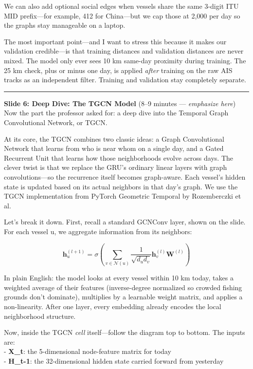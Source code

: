 \documentclass[
]{article}
\begin{document}
We can also add optional social edges when vessels share the same
3-digit ITU MID prefix---for example, 412 for China---but we cap those
at 2,000 per day so the graphs stay manageable on a laptop.

The most important point---and I want to stress this because it makes
our validation credible---is that training distances and validation
distances are never mixed. The model only ever sees 10 km same-day
proximity during training. The 25 km check, plus or minus one day, is
applied \emph{after} training on the raw AIS tracks as an independent
filter. Training and validation stay completely separate.

\begin{center}\rule{0.5\linewidth}{0.5pt}\end{center}

\textbf{Slide 6: Deep Dive: The TGCN Model} (8--9 minutes ---
\emph{emphasize here})\\
Now the part the professor asked for: a deep dive into the Temporal
Graph Convolutional Network, or TGCN.

At its core, the TGCN combines two classic ideas: a Graph Convolutional
Network that learns from who is near whom on a single day, and a Gated
Recurrent Unit that learns how those neighborhoods evolve across days.
The clever twist is that we replace the GRU's ordinary linear layers
with graph convolutions---so the recurrence itself becomes graph-aware.
Each vessel's hidden state is updated based on its actual neighbors in
that day's graph. We use the TGCN implementation from PyTorch Geometric
Temporal by Rozemberczki et al.

Let's break it down. First, recall a standard GCNConv layer, shown on
the slide. For each vessel u, we aggregate information from its
neighbors:

\[
\mathbf{h}_u^{(l+1)} = \sigma\left( \sum_{v \in \mathcal{N}(u)} \frac{1}{\sqrt{d_u d_v}} \mathbf{h}_v^{(l)} \mathbf{W}^{(l)} \right)
\]

In plain English: the model looks at every vessel within 10 km today,
takes a weighted average of their features (inverse-degree normalized so
crowded fishing grounds don't dominate), multiplies by a learnable
weight matrix, and applies a non-linearity. After one layer, every
embedding already encodes the local neighborhood structure.

Now, inside the TGCN \emph{cell} itself---follow the diagram top to
bottom. The inputs are:\\
- \textbf{X\_t}: the 5-dimensional node-feature matrix for today\\
- \textbf{H\_t-1}: the 32-dimensional hidden state carried forward from
yesterday
\end{document}
